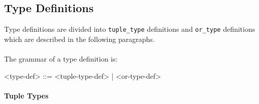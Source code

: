 \documentclass[diploma]{softlab-thesis}
\begin{document}
\subsection{Type Definitions}
\label{subsubsec:tdefs}

Type definitions are divided into \verb|tuple_type| definitions and
\verb|or_type| definitions which are described in the following paragraphs.
\\\\
The grammar of a type definition is:
\begin{grammar}
<type-def> ::= <tuple-type-def> | <or-type-def>
\end{grammar}

\paragraph{Tuple Types}
\end{document}
